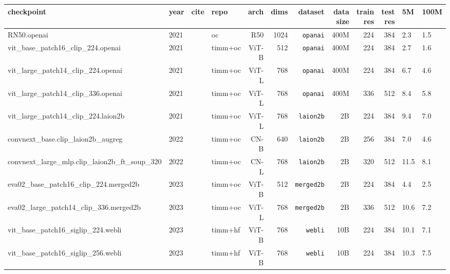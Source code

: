 \setlength{\tabcolsep}{4pt}
\begin{tabular}{llllrrrrrrRR}  \toprule 
\textbf{checkpoint}                               & \textbf{year} & \textbf{cite} & \textbf{repo} & \textbf{arch} & \textbf{dims} & \textbf{dataset}  & \textbf{data size} & \textbf{train res} & \textbf{test res} & \textbf{5M} & \textbf{100M} \\
\midrule
RN50.openai                                       & 2021 & \cite{clip}            & oc      & R50   & 1024 & \texttt{opanai}   & 400M  & 224 & 384 & 2.3  & 1.5  \\
vit\_base\_patch16\_clip\_224.openai              & 2021 & \cite{clip}            & timm+oc & ViT-B & 512  & \texttt{opanai}   & 400M  & 224 & 384 & 2.7  & 1.6  \\
vit\_large\_patch14\_clip\_224.openai             & 2021 & \cite{clip}            & timm+oc & ViT-L & 768  & \texttt{opanai}   & 400M  & 224 & 384 & 6.7  & 4.6  \\
vit\_large\_patch14\_clip\_336.openai             & 2021 & \cite{clip}            & timm+oc & ViT-L & 768  & \texttt{opanai}   & 400M  & 336 & 512 & 8.4  & 5.8  \\
vit\_large\_patch14\_clip\_224.laion2b            & 2021 & \cite{cbw+23,iww+21}   & timm+oc & ViT-L & 768  & \texttt{laion2b}  & 2B    & 224 & 384 & 9.4  & 7.0  \\
convnext\_base.clip\_laion2b\_augreg              & 2022 & \cite{iww+21,convnext} & timm+oc & CN-B  & 640  & \texttt{laion2b}  & 2B    & 256 & 384 & 7.0  & 4.6  \\
convnext\_large\_mlp.clip\_laion2b\_ft\_soup\_320 & 2022 & \cite{iww+21,convnext} & timm+oc & CN-L  & 768  & \texttt{laion2b}  & 2B    & 320 & 512 & 11.5 & 8.1  \\
eva02\_base\_patch16\_clip\_224.merged2b          & 2023 & \cite{fwx+23,evaclip}  & timm+oc & ViT-B & 512  & \texttt{merged2b} & 2B    & 224 & 384 & 4.4  & 2.5  \\
eva02\_large\_patch14\_clip\_336.merged2b         & 2023 & \cite{fwx+23,evaclip}  & timm+oc & ViT-L & 768  & \texttt{merged2b} & 2B    & 336 & 512 & 10.6 & 7.2  \\
vit\_base\_patch16\_siglip\_224.webli             & 2023 & \cite{siglip}          & timm+hf & ViT-B & 768  & \texttt{webli}    & 10B   & 224 & 384 & 10.1 & 7.1  \\
vit\_base\_patch16\_siglip\_256.webli             & 2023 & \cite{siglip}          & timm+hf & ViT-B & 768  & \texttt{webli}    & 10B   & 224 & 384 & 10.3 & 7.5  \\

\end{tabular}
